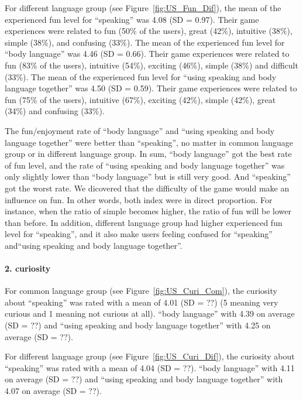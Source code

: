 For different language group (see Figure~\ref{fig:US_Fun_Dif}), the mean of the experienced fun level for ``speaking'' was 4.08 (SD = 0.97). Their game experiences were related to fun (50\% of the users), great (42\%), intuitive (38\%), simple (38\%), and confusing (33\%). The mean of the experienced fun level for ``body language'' was 4.46 (SD = 0.66). Their game experiences were related to fun (83\% of the users), intuitive (54\%), exciting (46\%), simple (38\%) and difficult (33\%). The mean of the experienced fun level for ``using speaking and body language together'' was 4.50 (SD = 0.59). Their game experiences were related to fun (75\% of the users), intuitive (67\%), exciting (42\%), simple (42\%), great (34\%) and confusing (33\%).

The fun/enjoyment rate of ``body language'' and ``using speaking and body language together'' were better than ``speaking'', no matter in common language group or in different language group. In sum, ``body language'' got the best rate of fun level, and the rate of ``using speaking and body language together'' was only slightly lower than ``body language'' but is still very good. And ``speaking'' got the worst rate. We dicovered that the difficulty of the game would make an influence on fun. In other words, both index were in direct proportion. For instance, when the ratio of simple becomes higher, the ratio of fun will be lower than before. In addition, different language group had higher experienced fun level for ``speaking'', and it also make users feeling confused for ``speaking'' and``using speaking and body language together''.



\paragraph{2. curiosity}

For common language group (see Figure~\ref{fig:US_Curi_Com}), the curiosity about ``speaking'' was rated with a mean of 4.01 (SD = ??) (5 meaning very curious and 1 meaning not curious at all). ``body language'' with 4.39 on average (SD = ??) and ``using speaking and body language together'' with 4.25 on average (SD = ??).

For different language group (see Figure~\ref{fig:US_Curi_Dif}), the curiosity about ``speaking'' was rated with a mean of 4.04 (SD = ??). ``body language'' with 4.11 on average (SD = ??) and ``using speaking and body language together'' with 4.07 on average (SD = ??).

